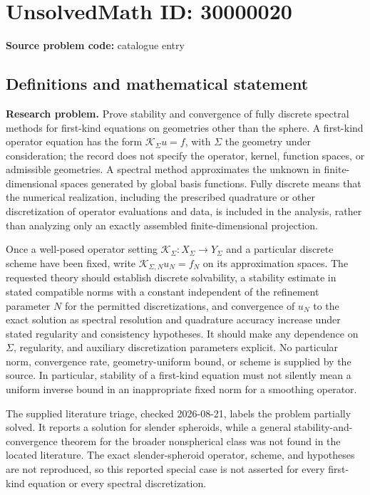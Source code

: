 \documentclass[11pt]{article}
\begin{document}
\section*{UnsolvedMath ID: 30000020}
\textbf{Source problem code:} catalogue entry
\subsection{Definitions and mathematical statement}
\textbf{Research problem.} Prove stability and convergence of fully discrete spectral methods for first-kind equations on geometries other than the sphere. A first-kind operator equation has the form \(\mathcal K_\Sigma u=f\), with \(\Sigma\) the geometry under consideration; the record does not specify the operator, kernel, function spaces, or admissible geometries. A spectral method approximates the unknown in finite-dimensional spaces generated by global basis functions. Fully discrete means that the numerical realization, including the prescribed quadrature or other discretization of operator evaluations and data, is included in the analysis, rather than analyzing only an exactly assembled finite-dimensional projection.\par Once a well-posed operator setting \(\mathcal K_\Sigma:X_\Sigma\to Y_\Sigma\) and a particular discrete scheme have been fixed, write \(\mathcal K_{\Sigma,N}u_N=f_N\) on its approximation spaces. The requested theory should establish discrete solvability, a stability estimate in stated compatible norms with a constant independent of the refinement parameter \(N\) for the permitted discretizations, and convergence of \(u_N\) to the exact solution as spectral resolution and quadrature accuracy increase under stated regularity and consistency hypotheses. It should make any dependence on \(\Sigma\), regularity, and auxiliary discretization parameters explicit. No particular norm, convergence rate, geometry-uniform bound, or scheme is supplied by the source. In particular, stability of a first-kind equation must not silently mean a uniform inverse bound in an inappropriate fixed norm for a smoothing operator.\par The supplied literature triage, checked 2026-08-21, labels the problem partially solved. It reports a solution for slender spheroids, while a general stability-and-convergence theorem for the broader nonspherical class was not found in the located literature. The exact slender-spheroid operator, scheme, and hypotheses are not reproduced, so this reported special case is not asserted for every first-kind equation or every spectral discretization.
\end{document}
